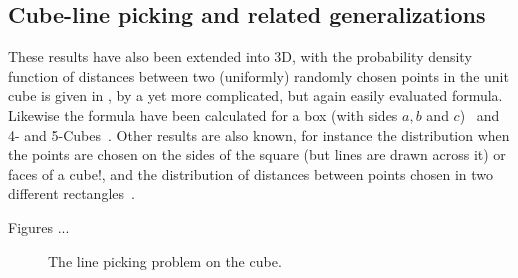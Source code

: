 \subsection{Cube-line picking and related generalizations}
\label{sec:cube_line}

These results have also been extended into 3D, with the probability
density function of distances between two (uniformly) randomly chosen
points in the unit cube is given in
\cite{mathai99:_distan,weisstein:_cube_line_picking}, by a yet more
complicated, but again easily evaluated formula. Likewise the formula
have been calculated for a box (with sides $a,b$ and
$c$)~\cite{philip:_probab_distr_distan_between_two} and 4- and
5-Cubes~\cite{philip:_probab_distr_distan_between_two_4d}. Other
results are also known, for instance the distribution when the points
are chosen on the sides of the square (but lines are drawn across it)
or faces of a cube!\cite{mathai99:_distan}, and the distribution of
distances between points chosen in two different
rectangles~\cite{b.ghosh51:_random_rect}.

Figures ...

\begin{figure}[tbp]
  \begin{center}
    \hspace{3mm}
    \caption{The line picking problem on the cube.}
  \end{center} 
\vspace{-4mm}
\end{figure}

